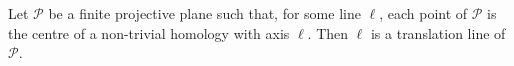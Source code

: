 Let $\mathcal{P}$ be a finite projective plane such that, for some line $\ell$, each point of $\mathcal{P}$ is the centre of a non-trivial homology with axis $\ell$. Then $\ell$ is a translation line of $\mathcal{P}$.

